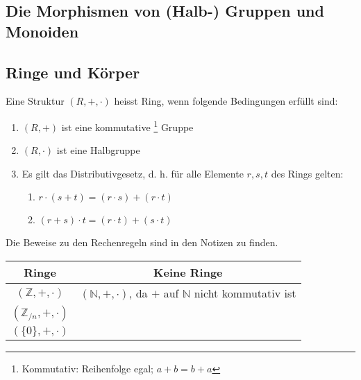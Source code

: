 \subsection{Die Morphismen von (Halb-) Gruppen und Monoiden}

\subsection{Ringe und Körper}
\begin{definition}
Eine Struktur $(R,+,\cdot)$ heisst Ring, wenn folgende Bedingungen erfüllt sind:
	\begin{enumerate}
		\item $(R, +)$ ist eine kommutative \footnote{Kommutativ: Reihenfolge egal; $a+b = b+a$} Gruppe
		\item $(R,\cdot)$ ist eine Halbgruppe
		\item Es gilt das Distributivgesetz, d. h. für alle Elemente $r,s,t$ des Rings gelten:
		\begin{enumerate}
			\item $r \cdot (s+t) = (r \cdot s) + (r \cdot t)$
			\item $(r+s) \cdot t = (r \cdot t) + (s \cdot t)$
		\end{enumerate}
	\end{enumerate}
\end{definition}
Die Beweise zu den Rechenregeln sind in den Notizen zu finden.
\begin{bsp}
\begin{tabular}{|c|c|}
\hline 
\rule[-1ex]{0pt}{2.5ex} Ringe & Keine Ringe \\ 
\hline 
\rule[-1ex]{0pt}{2.5ex} $(\mathbb{Z}, +, \cdot)$ & $(\mathbb{N}, +, \cdot)$, da $+$ auf $\mathbb{N}$ nicht kommutativ ist \\ 
\hline 
\rule[-1ex]{0pt}{2.5ex}  $(\mathbb{Z}_{/n}, +, \cdot)$ & \\ 
\hline 
\rule[-1ex]{0pt}{2.5ex}  $(\{0\}, +, \cdot)$ & \\ 
\hline 
\end{tabular} 
\end{bsp}

